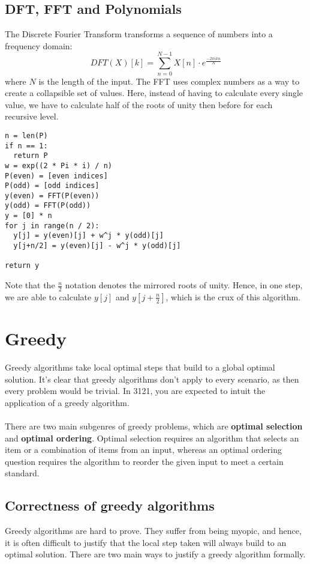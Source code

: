 \documentclass[journal, letterpaper]{IEEEtran}
\begin{document}
  \subsection{DFT, FFT and Polynomials}
  The Discrete Fourier Transform transforms a sequence of numbers into a frequency domain:
  \[DFT(X)[k] = \sum_{n=0}^{N-1} X[n] \cdot e^{\frac{-2\pi i k n }{N}} \]
  where $N$ is the length of the input.
  The FFT uses complex numbers as a way to create a collapsible set of values. Here, instead of having to calculate every single
  value, we have to calculate half of the roots of unity then before for each recursive level.
  \begin{verbatim}
n = len(P)
if n == 1:
  return P
w = exp((2 * Pi * i) / n)
P(even) = [even indices]
P(odd) = [odd indices]
y(even) = FFT(P(even))
y(odd) = FFT(P(odd))
y = [0] * n
for j in range(n / 2):
  y[j] = y(even)[j] + w^j * y(odd)[j]
  y[j+n/2] = y(even)[j] - w^j * y(odd)[j]

return y
  \end{verbatim}
  Note that the $\frac{n}{2}$ notation denotes the mirrored roots of unity. Hence, in one step, we are able to calculate $y[j]$
  and $y[j + \frac{n}{2}]$, which is the crux of this algorithm.
  \section{Greedy}
  Greedy algorithms take local optimal steps that build to a global optimal solution. It's clear that greedy algorithms don't 
  apply to every scenario, as then every problem would be trivial. In 3121, you are expected to intuit the application
  of a greedy algorithm. \\ \\ 
  There are two main subgenres of greedy problems, which are \textbf{optimal selection} and \textbf{optimal ordering}. Optimal
  selection requires an algorithm that selects an item or a combination of items from an input, whereas an optimal ordering question
  requires the algorithm to reorder the given input to meet a certain standard.
  \subsection{Correctness of greedy algorithms}
  Greedy algorithms are hard to prove. They suffer from being myopic, and hence, it is often difficult to justify that
  the local step taken will always build to an optimal solution. There are two main ways to justify a greedy algorithm
  formally. \\
\end{document}
